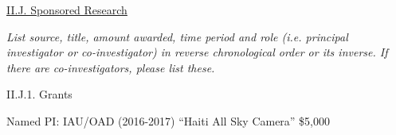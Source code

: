 \documentclass[11pt,letterpaper]{article}
\begin{document}



























\underline{II.J. Sponsored Research}

\textit{List source, title, amount awarded, time period and role (i.e. principal investigator or co-investigator) in reverse chronological order or its inverse.  If there are co-investigators, please list these.}

II.J.1. Grants

Named PI: IAU/OAD (2016-2017) ``Haiti All Sky Camera''
		\$5,000
\end{document}
